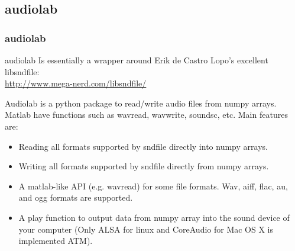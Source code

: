 \documentclass[10pt, colorlinks]{beamer}
\begin{document}
\subsection{audiolab} %
\label{sec:audiolab}
\begin{frame}[fragile]\frametitle{audiolab}
\begin{block}{audiolab}
Is essentially a  wrapper around Erik de Castro Lopo's excellent libsndfile:\\
    \centering \href{http://www.mega-nerd.com/libsndfile/}{http://www.mega-nerd.com/libsndfile/} 
\end{block}
\small
\begin{block}{}
Audiolab is a python package to read/write audio files from numpy arrays. Matlab have functions such as wavread, wavwrite, soundsc, etc. Main features are:
\begin{itemize}
    \item Reading all formats supported by sndfile directly into numpy arrays.
    \item Writing all formats supported by sndfile directly from numpy arrays.
    \item A matlab-like API (e.g. wavread) for some file formats. Wav, aiff, flac, au, and ogg formats are supported.
    \item A play function to output data from numpy array into the sound device of your computer (Only ALSA for linux and CoreAudio for Mac OS X is implemented ATM).
\end{itemize}
\end{block}

\end{frame}

\end{document}
